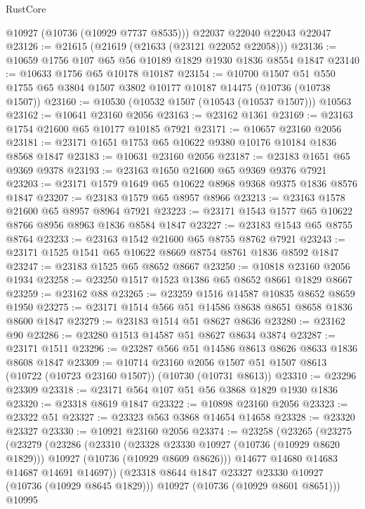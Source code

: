 \begin{lexlean}{RustCore}
\begin{coremodule}
      @10927
      (@10736 (@10929 @7737 @8535)))
    @22037
    @22040
    @22043
    @22047
@23126 := @21615 (@21619 (@21633 (@23121 @22052 @22058)))
@23136 := @10659 @1756 @107 @65 @56 @10189 @1829 @1930 @1836 @8554 @1847
@23140 := @10633 @1756 @65 @10178 @10187
@23154 := @10700
    @1507
    @51
    @550
    @1755
    @65
    @3804
    @1507
    @3802
    @10177
    @10187
    @14475
    (@10736 (@10738 @1507))
@23160 := @10530 (@10532 @1507 (@10543 (@10537 @1507))) @10563
@23162 := @10641 @23160 @2056
@23163 := @23162 @1361
@23169 := @23163 @1754 @21600 @65 @10177 @10185 @7921
@23171 := @10657 @23160 @2056
@23181 := @23171 @1651 @1753 @65 @10622 @9380 @10176 @10184 @1836 @8568 @1847
@23183 := @10631 @23160 @2056
@23187 := @23183 @1651 @65 @9369 @9378
@23193 := @23163 @1650 @21600 @65 @9369 @9376 @7921
@23203 := @23171 @1579 @1649 @65 @10622 @8968 @9368 @9375 @1836 @8576 @1847
@23207 := @23183 @1579 @65 @8957 @8966
@23213 := @23163 @1578 @21600 @65 @8957 @8964 @7921
@23223 := @23171 @1543 @1577 @65 @10622 @8766 @8956 @8963 @1836 @8584 @1847
@23227 := @23183 @1543 @65 @8755 @8764
@23233 := @23163 @1542 @21600 @65 @8755 @8762 @7921
@23243 := @23171 @1525 @1541 @65 @10622 @8669 @8754 @8761 @1836 @8592 @1847
@23247 := @23183 @1525 @65 @8652 @8667
@23250 := @10818 @23160 @2056 @1934
@23258 := @23250 @1517 @1523 @1386 @65 @8652 @8661 @1829 @8667
@23259 := @23162 @88
@23265 := @23259 @1516 @14587 @10835 @8652 @8659 @1950
@23275 := @23171 @1514 @566 @51 @14586 @8638 @8651 @8658 @1836 @8600 @1847
@23279 := @23183 @1514 @51 @8627 @8636
@23280 := @23162 @90
@23286 := @23280 @1513 @14587 @51 @8627 @8634 @3874
@23287 := @23171 @1511
@23296 := @23287 @566 @51 @14586 @8613 @8626 @8633 @1836 @8608 @1847
@23309 := @10714
    @23160
    @2056
    @1507
    @51
    @1507
    @8613
    (@10722 (@10723 @23160 @1507))
    (@10730 (@10731 @8613))
@23310 := @23296 @23309
@23318 := @23171 @564 @107 @51 @56 @3868 @1829 @1930 @1836
@23320 := @23318 @8619 @1847
@23322 := @10898 @23160 @2056
@23323 := @23322 @51
@23327 := @23323 @563 @3868 @14654 @14658
@23328 := @23320 @23327
@23330 := @10921 @23160 @2056
@23374 := @23258
    (@23265
      (@23275
        (@23279
          (@23286
            (@23310
              (@23328 @23330 @10927 (@10736 (@10929 @8620 @1829)))
              @10927
              (@10736 (@10929 @8609 @8626)))
            @14677
            @14680
            @14683
            @14687
            @14691
            @14697))
        (@23318 @8644 @1847 @23327 @23330 @10927 (@10736 (@10929 @8645 @1829)))
        @10927
        (@10736 (@10929 @8601 @8651)))
      @10995

\end{coremodule}
\end{lexlean}
